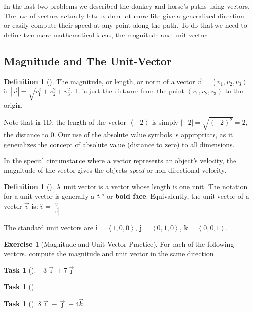 \documentclass[10pt,]{book}
\newcommand{\terminology}[1]{\textbf{#1}}
\theoremstyle{plain}
\theoremstyle{definition}
\newtheorem{definition}[theorem]{Definition}
\theoremstyle{definition}
\theoremstyle{definition}
\theoremstyle{definition}
\newtheorem{exploration}[project]{Exercise}
\newtheorem{task}[project]{Task}
\theoremstyle{definition}
\numberwithin{equation}{section}
\newcommand{\ii}{\vec \imath}
\newcommand{\jj}{\vec \jmath}
\newcommand{\kk}{\vec k}
\newcommand{\lt}{<}
\begin{document}
In the last two problems we described the donkey and horse's paths using vectors. The use of vectors actually lets us do a lot more like give a generalized direction or easily compute their speed at any point along the path. To do that we need to define two more mathematical ideas, the magnitude and unit-vector.%
\typeout{************************************************}
\typeout{************************************************}
\subsection[{Magnitude and The Unit-Vector}]{Magnitude and The Unit-Vector}\label{subsection-6}
\begin{definition}[{}]\label{definition-5}
The magnitude, or length, or norm of a vector \(\vec v = \left\lt v_1,v_2,v_3\right>\) is \(|\vec v| = \sqrt{v_1^2+v_2^2+v_3^2}\). It is just the distance from the point \((v_1,v_2,v_3)\) to the origin.%
\par
Note that in 1D, the length of the vector \(\left\lt -2\right>\) is simply \(|-2|=\sqrt{(-2)^2}=2\), the distance to 0. Our use of the absolute value symbols is appropriate, as it generalizes the concept of absolute value (distance to zero) to all dimensions.%
\end{definition}
In the special circumstance where a vector represents an object's velocity, the magnitude of the vector gives the objects \emph{speed} or non-directional velocity.%
\begin{definition}[{}]\label{definition-6}
A unit vector is a vector whose length is one unit. The notation for a unit vector is generally a ``\(\hat{\ }\)'' or \terminology{bold face}. Equivalently, the unit vector of a vector \(\vec{v}\) is: \(\hat{v}=\frac{\vec{v}}{|\vec{v}|}\)%
\par
The standard unit vectors are \(\mathbf{i}=\left\lt 1,0,0\right>\), \(\mathbf{j}=\left\lt 0,1,0\right>\), \(\mathbf{k}=\left\lt 0,0,1\right>\).%
\end{definition}
\begin{exploration}[Magnitude and Unit Vector Practice]\label{exploration-24}
For each of the following vectors, compute the magnitude and unit vector in the same direction.%
\begin{task}[]\label{task-43}
\(-3\ii + 7 \jj\)%
\end{task}
\begin{task}[]\label{task-44}
\(\lt -4,2,4>\)%
\end{task}
\begin{task}[]\label{task-45}
\(8\ii - \jj + 4 \kk\)%
\end{task}
\end{exploration}
\end{document}
